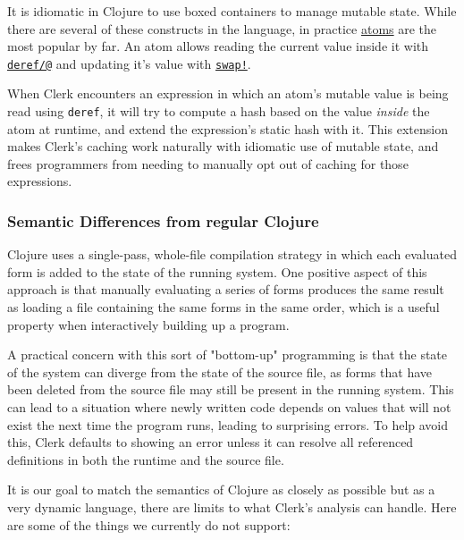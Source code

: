 \documentclass[
]{article}
\newcommand{\passthrough}[1]{#1}
\begin{document}
It is idiomatic in Clojure to use boxed containers to manage mutable state. While there are several of these constructs in the language, in practice \href{https://clojure.org/reference/atoms}{atoms} are the most popular by far. An atom allows reading the current value inside it with \href{https://clojure.github.io/clojure/clojure.core-api.html\#clojure.core/deref}{\passthrough{\lstinline!deref/@!}} and updating it's value with \href{https://clojure.github.io/clojure/clojure.core-api.html\#clojure.core/swap!}{\passthrough{\lstinline"swap!"}}.

When Clerk encounters an expression in which an atom's mutable value is being read using \passthrough{\lstinline!deref!}, it will try to compute a hash based on the value \emph{inside} the atom  at runtime, and extend the expression's static hash with it. This extension makes Clerk's caching work naturally with idiomatic use of mutable state, and frees programmers from needing to manually opt out of caching for those expressions.

\hypertarget{id}{%
\subsubsection{Semantic Differences from regular Clojure}\label{id}}

Clojure uses a single-pass, whole-file compilation strategy in which each evaluated form is added to the state of the running system. One positive aspect of this approach is that manually evaluating a series of forms produces the same result as loading a file containing the same forms in the same order, which is a useful property when interactively building up a program.

A practical concern with this sort of "bottom-up" programming is that the state of the system can diverge from the state of the source file, as forms that have been deleted from the source file may still be present in the running system. This can lead to a situation where newly written code depends on values that will not exist the next time the program runs, leading to surprising errors. To help avoid this, Clerk defaults to showing an error unless it can resolve all referenced definitions in both the runtime and the source file.

It is our goal to match the semantics of Clojure as closely as possible but as a very dynamic language, there are limits to what Clerk's analysis can handle. Here are some of the things we currently do not support:
\end{document}
